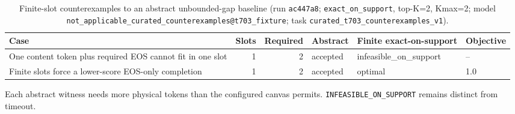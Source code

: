 \begin{table}[t]
\centering
\caption{Finite-slot counterexamples to an abstract unbounded-gap baseline (run \texttt{ac447a8}; \texttt{exact\_on\_support}, top-K=2, Kmax=2; model \texttt{not\_applicable\_curated\_counterexamples@t703\_fixture}; task \texttt{curated\_t703\_counterexamples\_v1}).}
\label{tab:mwpc-finite-slot-counterexamples}
\small
\begin{tabular}{p{5.0cm}rrlll}
\toprule
Case & Slots & Required & Abstract & Finite exact-on-support & Objective \\
\midrule
One content token plus required EOS cannot fit in one slot & 1 & 2 & accepted & infeasible\_on\_support & -- \\
Finite slots force a lower-score EOS-only completion & 1 & 2 & accepted & optimal & 1.0 \\
\bottomrule
\end{tabular}
\par\footnotesize Each abstract witness needs more physical tokens than the configured canvas permits. \texttt{INFEASIBLE\_ON\_SUPPORT} remains distinct from timeout.
\end{table}
